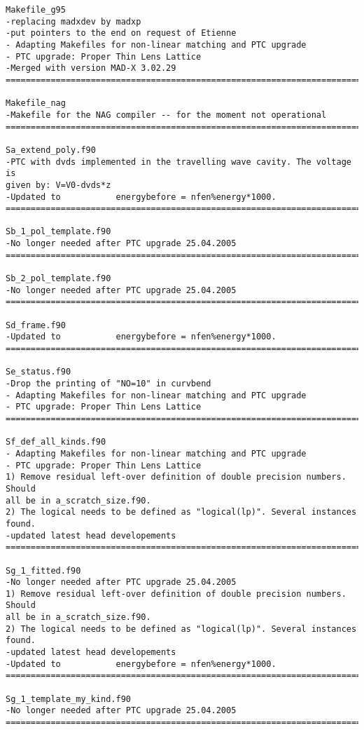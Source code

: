 \begin{verbatim}
Makefile_g95
-replacing madxdev by madxp
-put pointers to the end on request of Etienne
- Adapting Makefiles for non-linear matching and PTC upgrade
- PTC upgrade: Proper Thin Lens Lattice
-Merged with version MAD-X 3.02.29
=============================================================================

Makefile_nag
-Makefile for the NAG compiler -- for the moment not operational
=============================================================================

Sa_extend_poly.f90
-PTC with dvds implemented in the travelling wave cavity. The voltage is
given by: V=V0-dvds*z
-Updated to           energybefore = nfen%energy*1000.
=============================================================================

Sb_1_pol_template.f90
-No longer needed after PTC upgrade 25.04.2005
=============================================================================

Sb_2_pol_template.f90
-No longer needed after PTC upgrade 25.04.2005
=============================================================================

Sd_frame.f90
-Updated to           energybefore = nfen%energy*1000.
=============================================================================

Se_status.f90
-Drop the printing of "NO=10" in curvbend
- Adapting Makefiles for non-linear matching and PTC upgrade
- PTC upgrade: Proper Thin Lens Lattice
=============================================================================

Sf_def_all_kinds.f90
- Adapting Makefiles for non-linear matching and PTC upgrade
- PTC upgrade: Proper Thin Lens Lattice
1) Remove residual left-over definition of double precision numbers. Should
all be in a_scratch_size.f90.
2) The logical needs to be defined as "logical(lp)". Several instances found.
-updated latest head developements
=============================================================================

Sg_1_fitted.f90
-No longer needed after PTC upgrade 25.04.2005
1) Remove residual left-over definition of double precision numbers. Should
all be in a_scratch_size.f90.
2) The logical needs to be defined as "logical(lp)". Several instances found.
-updated latest head developements
-Updated to           energybefore = nfen%energy*1000.
=============================================================================

Sg_1_template_my_kind.f90
-No longer needed after PTC upgrade 25.04.2005
=============================================================================


\end{verbatim}
